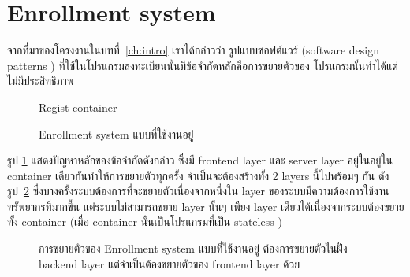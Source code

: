 \section {Enrollment system}

จากที่มาของโครงงานในบทที่~\ref{ch:intro} เราได้กล่าวว่า รูปแบบซอฟต์แวร์ (software design patterns \cite{sdp}) ที่ใช้ในโปรแกรมลงทะเบียนนั้นมีข้อจำกัดหลักคือการขยายตัวของ โปรแกรมนั้นทำได้แต่ไม่มีประสิทธิภาพ
%
\begin{figure}
    \centering
    \begin{center}
    Regist container \\
    \end{center}
    \caption[Poem]{Enrollment system แบบที่ใช้งานอยู่}
    \label{fig:old_regist_system}
\end{figure}
%
รูป \ref{fig:old_regist_system} แสดงปัญหาหลักของข้อจำกัดดังกล่าว ซึ่งมี frontend layer และ server layer อยู่ในอยู่ใน container เดียวกันทำให้การขยายตัวทุกครั้ง จำเป็นจะต้องสร้างทั้ง 2 layers นี้ไปพร้อมๆ กัน ดังรูป~\ref{fig:scaling_old_regist_system} ซึ่งบางครั้งระบบต้องการที่จะขยายตัวเนื่องจากหนึ่งใน layer ของระบบมีความต้องการใช้งานทรัพยากรที่มากขึ้น แต่ระบบไม่สามารถขยาย layer นั้นๆ เพียง layer เดียวได้เนื่องจากระบบต้องขยายทั้ง container (เมื่อ container นั้นเป็นโปรแกรมที่เป็น stateless \cite{slsf})
%
\begin{figure}
    \centering
    \begin{center}
    \end{center}
    \caption[Poem]{การขยายตัวของ Enrollment system แบบที่ใช้งานอยู่ ต้องการขยายตัวในฝั่ง backend layer แต่จำเป็นต้องขยายตัวของ frontend layer ด้วย}
    \label{fig:scaling_old_regist_system}
\end{figure}
